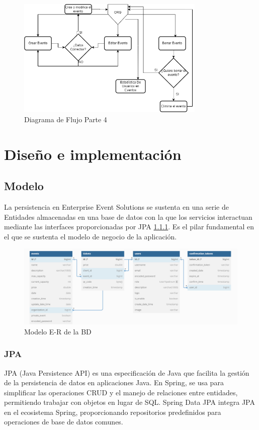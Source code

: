 \newpage
\begin{figure}[h]
    \centering
    \includegraphics[width=0.8\textwidth]{Org.png} 
    \caption{Diagrama de Flujo Parte 4}
    \label{fig:flujoEvs3}
\end{figure}
\section{Diseño e implementación}    
\subsection{Modelo}
La persistencia en Enterprise Event Solutions se sustenta en una serie de Entidades almacenadas en una base de datos con la que los servicios interactuan mediante
las interfaces proporcionadas por JPA \ref{sec:jpa}. Es el pilar fundamental en el que se sustenta el modelo de negocio de la aplicación.
\begin{figure}[h]
    \centering
    \includegraphics[width=1.0\textwidth]{EVSdiagra.png} 
    \caption{Modelo E-R de la BD}
    \label{fig:diagramaBD}
\end{figure}

\subsubsection{JPA}
\label{sec:jpa}

JPA (Java Persistence API) es una especificación de Java que facilita la gestión de la persistencia de datos en aplicaciones Java.
En Spring, se usa para simplificar las operaciones CRUD y el manejo de relaciones entre entidades, permitiendo trabajar con objetos en lugar de SQL. 
Spring Data JPA integra JPA en el ecosistema Spring, proporcionando repositorios predefinidos para operaciones de base de datos comunes.

